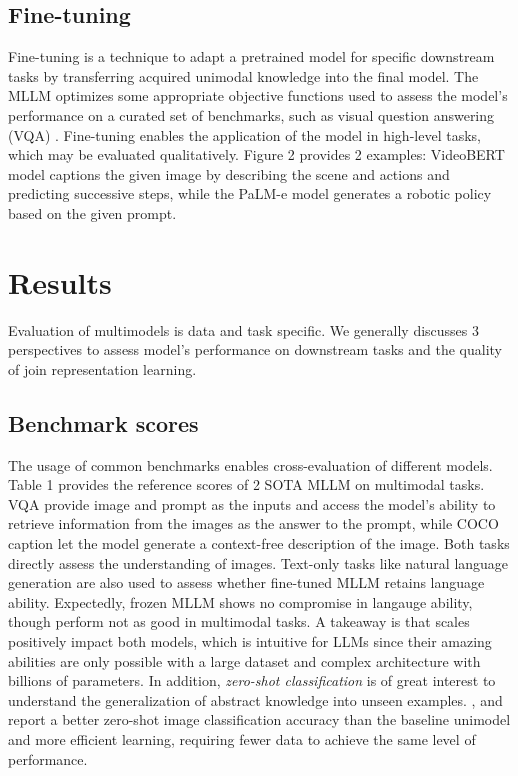 \documentclass[11pt]{article}
\begin{document}
\subsection{Fine-tuning}

Fine-tuning is a technique to adapt a pretrained model for specific downstream tasks by transferring acquired unimodal knowledge into the final model. The MLLM optimizes some appropriate objective functions used to assess the model's performance on a curated set of benchmarks, such as visual question answering (VQA) \citep{DBLP:journals/corr/abs-2306-13549}. Fine-tuning enables the application of the model in high-level tasks, which may be evaluated qualitatively. Figure 2 provides 2 examples: VideoBERT model \citep{DBLP:conf/iccv/SunMV0S19} captions the given image by describing the scene and actions and predicting successive steps, while the PaLM-e model \citep{DBLP:conf/icml/DriessXSLCIWTVY23} generates a robotic policy based on the given prompt.

\section{Results}
Evaluation of multimodels is data and task specific. We generally discusses 3 perspectives to assess model's performance on downstream tasks and the quality of join representation learning.

\subsection{Benchmark scores}


The usage of common benchmarks enables cross-evaluation of different models. Table 1 provides the reference scores of 2 SOTA MLLM on multimodal tasks. VQA \citep{DBLP:journals/ijcv/GoyalKASBP19} provide image and prompt as the inputs and access the model's ability to retrieve information from the images as the answer to the prompt, while COCO caption \citep{DBLP:journals/corr/ChenFLVGDZ15} let the model generate a context-free description of the image. Both tasks directly assess the understanding of images. Text-only tasks like natural language generation are also used to assess whether fine-tuned MLLM retains language ability. Expectedly, frozen MLLM shows no compromise in langauge ability, though perform not as good in multimodal tasks. A takeaway is that scales positively impact both models, which is intuitive for LLMs since their amazing abilities are only possible with a large dataset and complex architecture with billions of parameters. In addition, \textit{zero-shot classification} is of great interest to understand the generalization of abstract knowledge into unseen examples. \citet{DBLP:conf/icml/DriessXSLCIWTVY23}, \citet{DBLP:conf/icml/RadfordKHRGASAM21} and \citet{DBLP:conf/iccv/SunMV0S19} report a better zero-shot image classification accuracy than the baseline unimodel and more efficient learning, requiring fewer data to achieve the same level of performance. 
\end{document}
